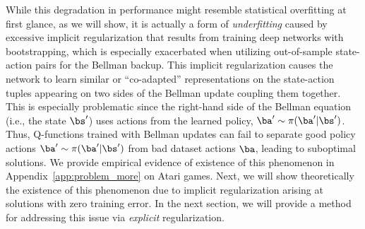 While this degradation in performance might resemble statistical overfitting at first glance, as we will show, it is actually a form of \emph{underfitting} caused by excessive implicit regularization that results from training deep networks with bootstrapping, which is especially exacerbated when utilizing out-of-sample state-action pairs for the Bellman backup. This implicit regularization causes the network to learn similar or ``co-adapted'' representations on the state-action tuples appearing on two sides of the Bellman update coupling them together. This is especially problematic since the right-hand side of the Bellman equation (i.e., the state $\bs'$) uses actions from the learned policy, $\ba' \sim \pi(\ba'|\bs')$. Thus, Q-functions trained with Bellman updates can fail to separate good policy actions $\ba' \sim \pi(\ba'|\bs')$ from bad dataset actions $\ba$, leading to suboptimal solutions.
We provide empirical evidence of existence of this phenomenon in Appendix~\ref{app:problem_more} on Atari games. Next, we will show theoretically the existence of this phenomenon due to implicit regularization arising at solutions with zero training error.
In the next section, we will provide a method for addressing this issue via \emph{explicit} regularization.

\vspace{-5pt}
